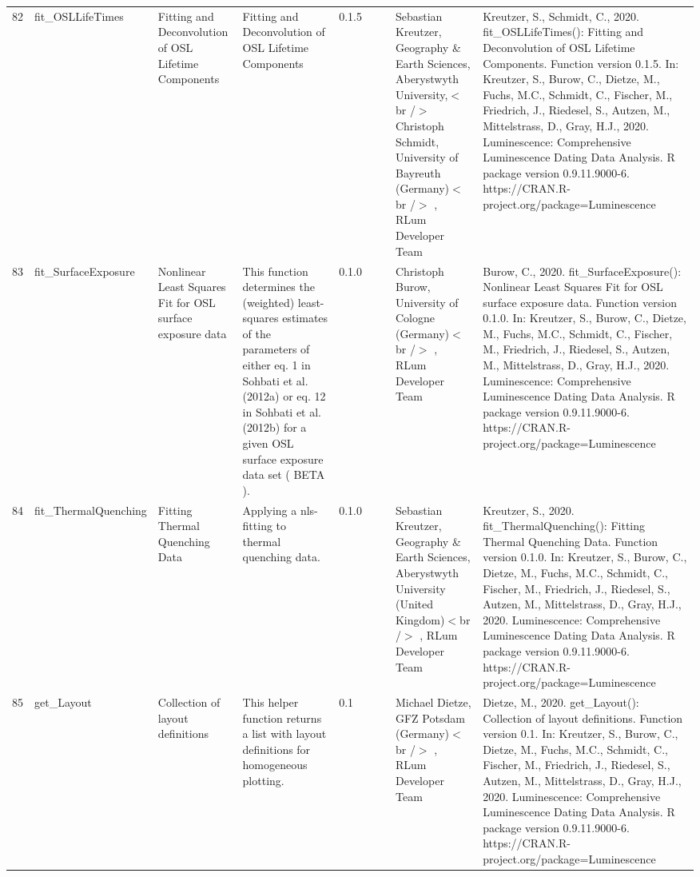 \begin{table}[ht]
\begin{tabular}{rllllllll}
 \\ 
  82 & fit\_OSLLifeTimes & Fitting and Deconvolution of OSL Lifetime Components & Fitting and Deconvolution of OSL Lifetime Components & 0.1.5
 &  &  & Sebastian Kreutzer, Geography \& Earth Sciences, Aberystwyth University,$<$br /$>$ Christoph Schmidt, University of Bayreuth (Germany)$<$br /$>$ , RLum Developer Team & Kreutzer, S., Schmidt, C., 2020. fit\_OSLLifeTimes(): Fitting and Deconvolution of OSL Lifetime Components. Function version 0.1.5. In: Kreutzer, S., Burow, C., Dietze, M., Fuchs, M.C., Schmidt, C., Fischer, M., Friedrich, J., Riedesel, S., Autzen, M., Mittelstrass, D., Gray, H.J., 2020. Luminescence: Comprehensive Luminescence Dating Data Analysis. R package version 0.9.11.9000-6. https://CRAN.R-project.org/package=Luminescence
 \\ 
  83 & fit\_SurfaceExposure & Nonlinear Least Squares Fit for OSL surface exposure data & This function determines the (weighted) least-squares estimates of the parameters of either eq. 1 in  Sohbati et al. (2012a)  or eq. 12 in Sohbati et al. (2012b)  for a given OSL surface exposure data set ( BETA ). & 0.1.0
 &  &  & Christoph Burow, University of Cologne (Germany)$<$br /$>$ , RLum Developer Team & Burow, C., 2020. fit\_SurfaceExposure(): Nonlinear Least Squares Fit for OSL surface exposure data. Function version 0.1.0. In: Kreutzer, S., Burow, C., Dietze, M., Fuchs, M.C., Schmidt, C., Fischer, M., Friedrich, J., Riedesel, S., Autzen, M., Mittelstrass, D., Gray, H.J., 2020. Luminescence: Comprehensive Luminescence Dating Data Analysis. R package version 0.9.11.9000-6. https://CRAN.R-project.org/package=Luminescence
 \\ 
  84 & fit\_ThermalQuenching & Fitting Thermal Quenching Data & Applying a nls-fitting to thermal quenching data. & 0.1.0
 &  &  & Sebastian Kreutzer, Geography \& Earth Sciences, Aberystwyth University (United Kingdom)$<$br /$>$ , RLum Developer Team & Kreutzer, S., 2020. fit\_ThermalQuenching(): Fitting Thermal Quenching Data. Function version 0.1.0. In: Kreutzer, S., Burow, C., Dietze, M., Fuchs, M.C., Schmidt, C., Fischer, M., Friedrich, J., Riedesel, S., Autzen, M., Mittelstrass, D., Gray, H.J., 2020. Luminescence: Comprehensive Luminescence Dating Data Analysis. R package version 0.9.11.9000-6. https://CRAN.R-project.org/package=Luminescence
 \\ 
  85 & get\_Layout & Collection of layout definitions & This helper function returns a list with layout definitions for homogeneous plotting. & 0.1
 &  &  & Michael Dietze, GFZ Potsdam (Germany)$<$br /$>$ , RLum Developer Team & Dietze, M., 2020. get\_Layout(): Collection of layout definitions. Function version 0.1. In: Kreutzer, S., Burow, C., Dietze, M., Fuchs, M.C., Schmidt, C., Fischer, M., Friedrich, J., Riedesel, S., Autzen, M., Mittelstrass, D., Gray, H.J., 2020. Luminescence: Comprehensive Luminescence Dating Data Analysis. R package version 0.9.11.9000-6. https://CRAN.R-project.org/package=Luminescence

\end{tabular}
\end{table}
